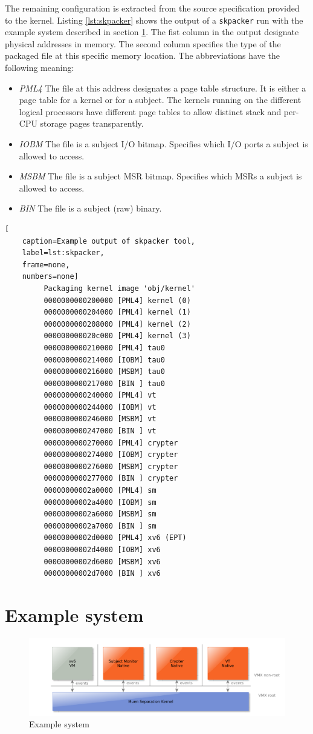 The remaining configuration is extracted from the source specification provided
to the kernel. Listing \ref{lst:skpacker} shows the output of a
\texttt{skpacker} run with the example system described in section
\ref{sec:example-system}. The fist column in the output designate physical
addresses in memory. The second column specifies the type of the packaged file
at this specific memory location. The abbreviations have the following meaning:

\begin{itemize}
	\item \emph{PML4} The file at this address designates a page table
		structure. It is either a page table for a kernel or for a subject. The
		kernels running on the different logical processors have different page
		tables to allow distinct stack and per-CPU storage pages transparently.
	\item \emph{IOBM} The file is a subject I/O bitmap. Specifies which I/O
		ports a subject is allowed to access.
	\item \emph{MSBM} The file is a subject MSR bitmap. Specifies which MSRs a
		subject is allowed to access.
	\item \emph{BIN} The file is a subject (raw) binary.
\end{itemize}

\begin{lstlisting}[
	caption=Example output of skpacker tool,
	label=lst:skpacker,
	frame=none,
	numbers=none]
         Packaging kernel image 'obj/kernel'
         0000000000200000 [PML4] kernel (0)
         0000000000204000 [PML4] kernel (1)
         0000000000208000 [PML4] kernel (2)
         000000000020c000 [PML4] kernel (3)
         0000000000210000 [PML4] tau0
         0000000000214000 [IOBM] tau0
         0000000000216000 [MSBM] tau0
         0000000000217000 [BIN ] tau0
         0000000000240000 [PML4] vt
         0000000000244000 [IOBM] vt
         0000000000246000 [MSBM] vt
         0000000000247000 [BIN ] vt
         0000000000270000 [PML4] crypter
         0000000000274000 [IOBM] crypter
         0000000000276000 [MSBM] crypter
         0000000000277000 [BIN ] crypter
         00000000002a0000 [PML4] sm
         00000000002a4000 [IOBM] sm
         00000000002a6000 [MSBM] sm
         00000000002a7000 [BIN ] sm
         00000000002d0000 [PML4] xv6 (EPT)
         00000000002d4000 [IOBM] xv6
         00000000002d6000 [MSBM] xv6
         00000000002d7000 [BIN ] xv6
\end{lstlisting}

\section{Example system}\label{sec:example-system}
\begin{figure}[h]
	\centering
	\includegraphics[width=\textwidth]{images/architecture-example_system}
	\caption{Example system}
	\label{fig:example-system}
\end{figure}
